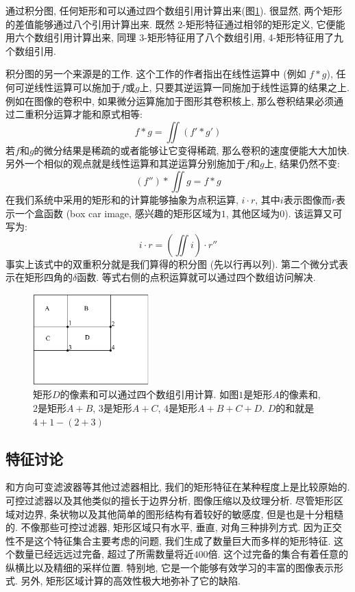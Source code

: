 \documentclass[a4paper,utf8,11pt, onecolumn]{ctexart}
\begin{document}
通过积分图, 任何矩形和可以通过四个数组引用计算出来(图\ref{fig:feature_calculate}). 很显然, 两个矩形的差值能够通过八个引用计算出来. 既然 2-矩形特征通过相邻的矩形定义, 它便能用六个数组引用计算出来, 同理 3-矩形特征用了八个数组引用, 4-矩形特征用了九个数组引用.

积分图的另一个来源是\citet{simard1999boxlets}的工作. 这个工作的作者指出在线性运算中 (例如 $f\ast g$), 任何可逆线性运算可以施加于$f$或$g$上, 只要其逆运算一同施加于线性运算的结果之上. 例如在图像的卷积中, 如果微分运算施加于图形其卷积核上, 那么卷积结果必须通过二重积分运算才能和原式相等:
\[
    f\ast g = \iint(f'\ast g')
\]
若$f$和$g$的微分结果是稀疏的或者能够让它变得稀疏, 那么卷积的速度便能大大加快. 另外一个相似的观点就是线性运算和其逆运算分别施加于$f$和$g$上, 结果仍然不变:
\[
    (f'')\ast\iint g = f\ast g
\]
在我们系统中采用的矩形和的计算能够抽象为点积运算, $i\cdot r$, 其中$i$表示图像而$r$表示一个盒函数 (box car image, 感兴趣的矩形区域为$1$, 其他区域为$0$). 该运算又可写为:
\[
    i\cdot r = (\iint i)\cdot r''
\]
事实上该式中的双重积分就是我们算得的积分图 (先以行再以列). 第二个微分式表示在矩形四角的$\delta$函数. 等式右侧的点积运算就可以通过四个数组访问解决.
\begin{figure}[!t]
\centering
\includegraphics[width=0.4\textwidth]{feature_calculate.png}
\caption{矩形$D$的像素和可以通过四个数组引用计算. 如图$1$是矩形$A$的像素和, $2$是矩形$A+B$, $3$是矩形$A+C$, $4$是矩形$A+B+C+D$. $D$的和就是$4+1-(2+3)$}
\label{fig:feature_calculate}
\end{figure}

\subsection{特征讨论}
和方向可变滤波器\citep{freeman1991design,greenspan1994overcomplete}等其他过滤器相比, 我们的矩形特征在某种程度上是比较原始的. 可控过滤器以及其他类似的擅长于边界分析, 图像压缩以及纹理分析. 
尽管矩形区域对边界, 条状物以及其他简单的图形结构有着较好的敏感度, 但是也是十分粗糙的. 不像那些可控过滤器, 矩形区域只有水平, 垂直, 对角三种排列方式. 因为正交性不是这个特征集合主要考虑的问题, 我们生成了数量巨大而多样的矩形特征. 这个数量已经远远过完备, 超过了所需数量将近$400$倍.
这个过完备的集合有着任意的纵横比以及精细的采样位置. 特别地, 它是一个能够有效学习的丰富的图像表示形式. 另外, 矩形区域计算的高效性极大地弥补了它的缺陷. 
\end{document}
